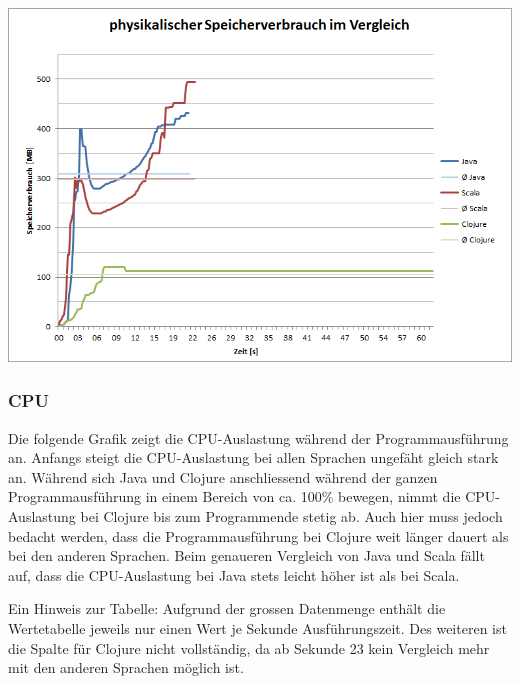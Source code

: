 \documentclass{fancydocument}
\begin{document}
\begin{center}
\includegraphics[width=\linewidth]{bilder/MemoryAll.png}
\end{center}
\subsubsection{CPU}
Die folgende Grafik zeigt die CPU-Auslastung während der Programmausführung an. Anfangs steigt die CPU-Auslastung bei allen Sprachen ungefäht gleich stark an. Während sich Java und Clojure anschliessend während der ganzen Programmausführung in einem Bereich von ca. 100\% bewegen, nimmt die CPU-Auslastung bei Clojure bis zum Programmende stetig ab. Auch hier muss jedoch bedacht werden, dass die Programmausführung bei Clojure weit länger dauert als bei den anderen Sprachen. Beim genaueren Vergleich von Java und Scala fällt auf, dass die CPU-Auslastung bei Java stets leicht höher ist als bei Scala.

\bigskip
\noindent
Ein Hinweis zur Tabelle: Aufgrund der grossen Datenmenge enthält die Wertetabelle jeweils nur einen Wert je Sekunde Ausführungszeit. Des weiteren ist die Spalte für Clojure nicht vollständig, da ab Sekunde 23 kein Vergleich mehr mit den anderen Sprachen möglich ist.
\end{document}
